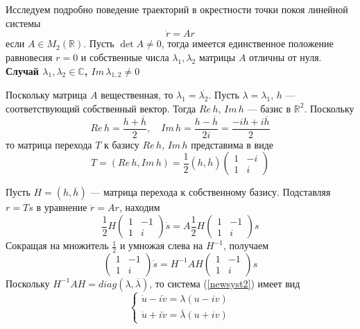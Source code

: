 Исследуем подробно поведение траекторий в окрестности точки покоя линейной системы
\begin{equation*}
    \dot{r} = Ar
\end{equation*}
если $A \in M_2(\mathbb{R})$. Пусть $\det A \neq 0$, тогда имеется единственное положение равновесия $r = 0$ и собственные числа $\lambda_1, \lambda_2$ матрицы $A$ отличны от нуля.\\

\noindent \textbf{Случай $\lambda_1, \lambda_2 \in \mathbb{C}$, $Im\, \lambda_{1,2} \neq 0$}

Поскольку матрица $A$ вещественная, то $\lambda_1 = \overline{\lambda_2}$. Пусть $\lambda = \lambda_1$, $h$ --- соответствующий собственный вектор. Тогда $Re\, h$, $Im\, h$ --- базис в $\mathbb{R}^2$. Поскольку
\begin{equation*}
    Re\, h = \frac{h + \overline{h}}{2}, \quad Im\, h = \frac{h - \overline{h}}{2i} = \frac{-ih + i\overline{h}}{2}
\end{equation*}
то матрица перехода $T$ к базису $Re\, h$, $Im\, h$ представима в виде
\begin{equation*}
    T = (Re\, h, Im\, h) = \frac{1}{2}(h,\overline{h})
    \begin{pmatrix}
    1 & -i\\
    1 & i
    \end{pmatrix}
\end{equation*}

Пусть $H = (h, \overline{h})$ --- матрица перехода к собственному базису. Подставляя $r = Ts$ в уравнение $\dot{r} = Ar$, находим
\begin{equation*}
    \frac{1}{2}H
    \begin{pmatrix}
    1 & -1\\
    1 & i
    \end{pmatrix}
    \dot{s} = A\frac{1}{2}H
    \begin{pmatrix}
    1 & -1\\
    1 & i
    \end{pmatrix}
    s
\end{equation*}
Сокращая на множитель $\frac{1}{2}$ и умножая слева на $H^{-1}$, получаем
\begin{equation}
    \begin{pmatrix}
    1 & -1\\
    1 & i
    \end{pmatrix}
    \dot{s} = H^{-1}AH
    \begin{pmatrix}
    1 & -1\\
    1 & i
    \end{pmatrix}
    s \label{newsyst2}
\end{equation}
Поскольку $H^{-1}AH = diag(\lambda, \overline{\lambda})$, то система (\ref{newsyst2}) имеет вид
\begin{equation*}
    \begin{cases}
    \dot{u} - i\dot{v} = \lambda(u - iv)\\
    \dot{u} + i\dot{v} = \overline{\lambda}(u + iv)
    \end{cases}
\end{equation*}

